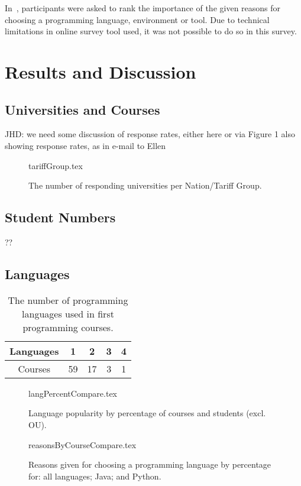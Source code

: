 \documentclass{sig-alternate}
\begin{document}
In~\cite{mason+cooper:2014}, participants were asked to rank the importance of the given reasons for choosing a programming language, environment or tool. Due to technical limitations in online survey tool used, it was not possible to do so in this survey.

\section{Results and Discussion}\label{results}

\subsection{Universities and Courses}
JHD: we need some discussion of response rates, either here or via Figure 1 also showing response rates, as in e-mail to Ellen
\begin{figure}
\begin{center}
{tariffGroup.tex}\vskip-12pt
\caption{The number of responding universities per Nation/Tariff Group.}
\end{center}
\end{figure}

\subsection{Student Numbers}
??
\subsection{Languages}

\begin{table}[]
\centering
\caption{The number of programming languages used in first programming courses.}
\label{tab:numLanguages}
\begin{tabular}{ccccc}
\hline
Languages & 1  & 2  & 3 & 4 \\ \hline
Courses   & 59 & 17 & 3 & 1 \\ \hline
\end{tabular}
\end{table}

\begin{figure}
\begin{center}
{langPercentCompare.tex}
\end{center}
\caption{Language popularity by percentage of courses and students (excl. OU).}
\end{figure}

\begin{figure}
\begin{center}
{reasonsByCourseCompare.tex}
\end{center}
\caption{Reasons given for choosing a programming language by percentage for: all languages; Java; and Python.}
\end{figure}
\end{document}
